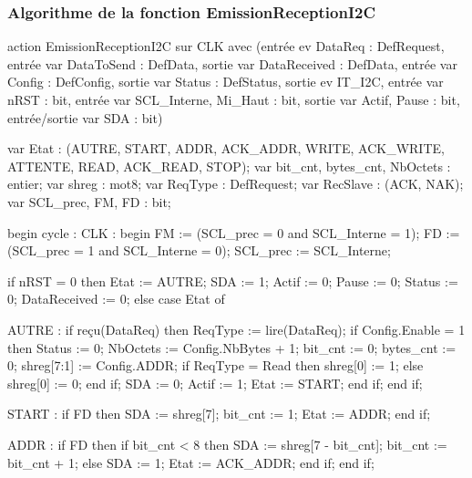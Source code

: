 \subsubsection{Algorithme de la fonction EmissionReceptionI2C}

\begin{VHDLcode}[caption={Algorithme de la fonction EmissionReceptionI2C}, label={lst:v}]
action EmissionReceptionI2C sur CLK avec
(entrée ev DataReq : DefRequest,
 entrée var DataToSend : DefData,
 sortie var DataReceived : DefData,
 entrée var Config : DefConfig,
 sortie var Status : DefStatus,
 sortie ev IT_I2C,
 entrée var nRST : bit,
 entrée var SCL_Interne, Mi_Haut : bit,
 sortie var Actif, Pause : bit,
 entrée/sortie var SDA : bit)

var Etat : (AUTRE, START, ADDR, ACK_ADDR, WRITE, ACK_WRITE, ATTENTE, READ, ACK_READ, STOP);
var bit_cnt, bytes_cnt, NbOctets : entier;
var shreg : mot8;
var ReqType : DefRequest;
var RecSlave : (ACK, NAK);
var SCL_prec, FM, FD : bit;

begin
  cycle :
    CLK : begin
      FM := (SCL_prec = 0 and SCL_Interne = 1);        
      FD := (SCL_prec = 1 and SCL_Interne = 0);       
      SCL_prec := SCL_Interne;

      if nRST = 0 then
        Etat := AUTRE; SDA := 1; Actif := 0; Pause := 0;
        Status := 0; DataReceived := 0;
      else
        case Etat of

          AUTRE :
            if reçu(DataReq) then
              ReqType := lire(DataReq);
              if Config.Enable = 1 then                
                Status := 0;                          
                NbOctets := Config.NbBytes + 1;
                bit_cnt := 0; bytes_cnt := 0;
                shreg[7:1] := Config.ADDR;
                if ReqType = Read then shreg[0] := 1; else shreg[0] := 0; end if;
                SDA := 0;                              
                Actif := 1;                            
                Etat := START;
              end if;
            end if;

          START :
            if FD then
              SDA := shreg[7]; bit_cnt := 1;          
              Etat := ADDR;
            end if;

          ADDR :
            if FD then
              if bit_cnt < 8 then
                SDA := shreg[7 - bit_cnt]; bit_cnt := bit_cnt + 1;   
              else
                SDA := 1;                              
                Etat := ACK_ADDR;
              end if;
            end if;


\end{VHDLcode}
